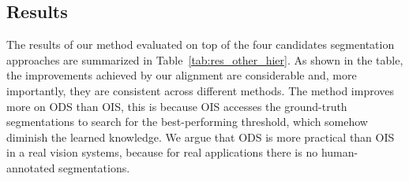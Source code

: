 
\subsection{Results}
The results of our method evaluated on top of the four candidates
segmentation approaches are summarized in
Table~\ref{tab:res_other_hier}. As shown in the table, the
improvements achieved by our alignment are considerable and, more
importantly, they are consistent across different methods.  The method
improves more on ODS than OIS, this is because OIS accesses the
ground-truth segmentations to search for the best-performing
threshold, which somehow diminish the learned knowledge.
We argue that ODS is more practical than OIS in a real vision systems,
because for real applications there is no human-annotated segmentations.

